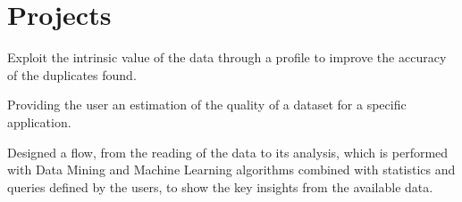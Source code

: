 \documentclass[10pt,a4paper,colorlinks,linkcolor=true]{moderncv}
\begin{document}
\section{Projects}

  {Exploit the intrinsic value of the data through a profile to improve the accuracy of the duplicates found.}

  {Providing the user an estimation of the quality of a dataset for a specific application.}

  {Designed a flow, from the reading of the data to its analysis, which is performed with Data Mining and Machine Learning algorithms combined with statistics and queries defined by the users, to show the key insights from the available data.}










\end{document}
